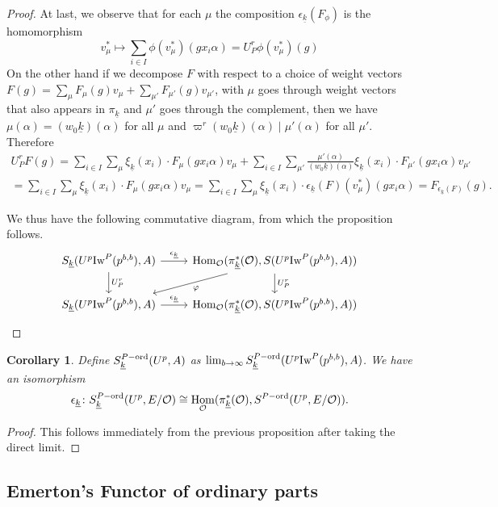 \documentclass[leqno]{amsart}
\newcommand{\wt}[1]{\underline{ #1 }}
\newcommand{\Iw}{\textnormal{Iw}}
\newcommand{\ord}{\textnormal{ord}}
\newcommand{\oo}{\mathcal{O}} %
\DeclareMathOperator{\Hom}{Hom}
\newtheorem{cor}[thm]{Corollary}
\theoremstyle{definition}
\theoremstyle{remark}
\begin{document}
\begin{proof}
	At last, we observe that for each $\mu$ 
	the composition
	$\epsilon_{\wt{k}}(F_\phi)$ is the homomorphism
	\[
		v_\mu^*\mapsto \sum_{i\in I}\phi(v_\mu^*)
		(gx_i\alpha) =U_P^r\phi(v_\mu^*)(g)
	\]
	On the other hand 
	if we decompose $F$ with respect to a choice of 
	weight vectors
	$F(g)=\sum_\mu F_\mu(g)v_\mu+
	\sum_{\mu'}F_{\mu'}(g)v_{\mu'}$, 
	with $\mu$ goes through weight vectors 
	that also appears in $\pi_{\wt{k}}$
	and $\mu'$ goes through the complement,
	then we have
	$\mu(\alpha)=(w_0\wt{k})(\alpha)$ for all $\mu$
	and  $\varpi^r(w_0\wt{k})(\alpha)\mid \mu'(\alpha)$
	for all $\mu'$.
	Therefore
	\begin{multline*}
	U_P^rF(g)=
	\sum_{i\in I}
	\sum_\mu \xi_{\wt{k}}(x_i)\cdot F_\mu(gx_i\alpha)v_\mu+
	\sum_{i\in I}
	\sum_{\mu'}\frac{\mu'(\alpha)}{(w_0\wt{k})(\alpha)}
	\xi_{\wt{k}}(x_i)\cdot F_{\mu'}(gx_i\alpha)v_{\mu'}\\=
	\sum_{i\in I}
	\sum_\mu \xi_{\wt{k}}(x_i)\cdot F_\mu(gx_i\alpha)v_\mu=
	\sum_{i\in I}
	\sum_\mu \xi_{\wt{k}}(x_i)\cdot
	\epsilon_{\wt{k}}(F)(v^*_\mu)(gx_i\alpha)
	=F_{\epsilon_{\wt{k}}(F)}(g).
	\end{multline*}

	We thus have the following commutative diagram,
	from which the proposition follows.
	\[
	\begin{tikzcd}
		S_{\wt{k}}(U^p\Iw^P(p^{b,b}),A)
		\arrow[r,"\epsilon_{\wt{k}}"]
		\arrow[d,"U_P^r"]
		& \Hom_\oo(\pi^*_{\wt{k}}(\oo), S(U^p\Iw^P(p^{b,b}),A))
		\arrow[d,"U_P^r"]
		\arrow[dl,"\varphi"]\\
		S_{\wt{k}}(U^p\Iw^P(p^{b,b}),A)
		\arrow[r,"\epsilon_{\wt{k}}"]
		& \Hom_\oo(\pi^*_{\wt{k}}(\oo), S(U^p\Iw^P(p^{b,b}),A))
	\end{tikzcd}	
	\]
\end{proof}

\begin{cor}
	Define $S_{\wt{k}}^{P-\ord}(U^p,A)$ 
	as $\lim_{b\to \infty}
	S_{\wt{k}}^{P-\ord}(U^p\Iw^P(p^{b,b}),A)$.
	We have an isomorphism
	\[
		\epsilon_{\wt{k}} \colon 
		S_{\wt{k}}^{P-\ord}(U^p,E/\oo)\cong 
		\Hom_{\oo}(\pi_{\wt{k}}^*(\oo),
		S^{P-\ord}(U^p,E/\oo)).
	\]
\end{cor}
\begin{proof}
This follows immediately from the previous proposition
after taking the direct limit.
\end{proof}


\subsection{Emerton's Functor of ordinary parts}
\end{document}
